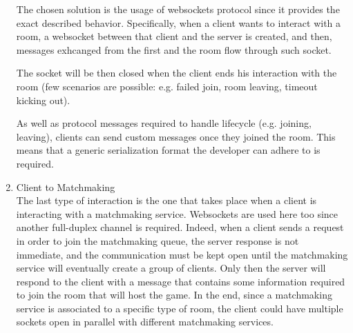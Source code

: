 \begin{enumerate}
	The chosen solution is the usage of websockets protocol since it provides the exact described behavior. Specifically, when a client wants to interact with a room, a websocket between that client and the server is created, and then, messages exhcanged from the first and the room flow through such socket.
	
    The socket will be then closed when the client ends his interaction with the room (few scenarios are possible: e.g. failed join, room leaving, timeout kicking out).

 	As well as protocol messages required to handle lifecycle (e.g. joining, leaving),  clients can send custom messages once they joined the room. This means that a generic serialization format the developer can adhere to is required.
	
	
	\item Client to Matchmaking \\
	The last type of interaction is the one that takes place when a client is interacting with a matchmaking service. Websockets are used here too since another full-duplex channel is required. Indeed, when a client sends a request in order to join the matchmaking queue, the server response is not immediate, and the communication must be kept open until the matchmaking service will eventually create a group of clients. Only then the server will respond to the client with a message that contains some information required to join the room that will host the game.
	In the end, since a matchmaking service is associated to a specific type of room, the client could have multiple sockets open in parallel with different matchmaking services.
\end{enumerate}









